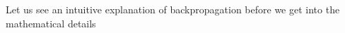 \begin{frame}
\begin{columns}
    \begin{overlayarea}{\textwidth}{\textheight}
          \makebox[\textwidth][c]{\usebox{\figurethreecontent}}
      \justifying
    \end{overlayarea}
  \end{columns}
\end{frame}

\begin{frame}
  Let us see an intuitive explanation of backpropagation before we get into the mathematical details
\end{frame}


